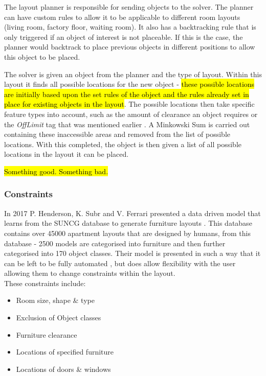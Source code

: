 The layout planner is responsible for sending objects to the solver. The planner can have custom rules to allow it to be applicable to different room layouts (living room, factory floor, waiting room). It also has a backtracking rule that is only triggered if an object of interest is not placeable. If this is the case, the planner would backtrack to place previous objects in different positions to allow this object to be placed.

The solver is given an object from the planner and the type of layout. Within this layout it finds all possible locations for the new object - \hl{these possible locations are initially based upon the set rules of the object and the rules already set in place for existing objects in the layout}. The possible locations then take specific feature types into account, such as the amount of clearance an object requires or the \textit{OffLimit} tag that was mentioned earlier \cite{rule-based-layout}. A Minkowski Sum \cite{minkowski} is carried out containing these inaccessible areas and removed from the list of possible locations.
With this completed, the object is then given a list of all possible locations in the layout it can be placed.

\hl{Something good. Something bad.}

\subsubsection*{Constraints}
In 2017 P. Henderson, K. Subr and V. Ferrari presented a data driven model that learns from the SUNCG \cite{suncg} database to generate furniture layouts \cite{constrained-layouts}. This database contains over 45000 apartment layouts that are designed by humans, from this database - 2500 models are categorised into furniture and then further categorised into 170 object classes.
Their model is presented in such a way that it can be left to be fully automated \cite{constrained-layouts}, but does allow flexibility with the user allowing them to change constraints within the layout.\\
These constraints include:
\begin{itemize}
    \item Room size, shape \& type 
    \item Exclusion of Object classes
    \item Furniture clearance 
    \item Locations of specified furniture
    \item Locations of doors \& windows
\end{itemize}

